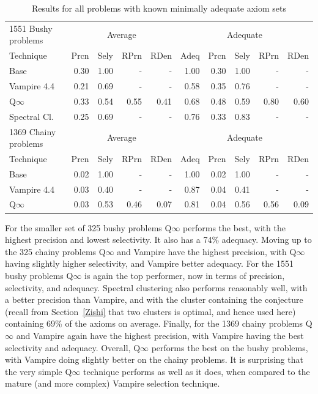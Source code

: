 \documentclass[EPiC]{easychair}
\begin{document}
\begin{table}[hbt]
\begin{center}
\begin{tabular}{|l|rrrr|r|rrrr|}
\hline
1551 Bushy problems  & \multicolumn{4}{|c|}{Average} & \multicolumn{5}{|c|}{Adequate} \\
Technique       & Prcn & Sely & RPrn & RDen & Adeq & Prcn & Sely & RPrn & RDen \\
\hline
Base            & 0.30 & 1.00 &  -   &  -   & 1.00 & 0.30 & 1.00 &  -   &  -   \\
Vampire 4.4     & 0.21 & 0.69 &  -   &  -   & 0.58 & 0.35 & 0.76 &  -   &  -   \\
Q$\infty$       & 0.33 & 0.54 & 0.55 & 0.41 & 0.68 & 0.48 & 0.59 & 0.80 & 0.60 \\
Spectral Cl.    & 0.25 & 0.69 &  -   &  -   & 0.76 & 0.33 & 0.83 &  -   &  -   \\
\hline
\hline
1369 Chainy problems & \multicolumn{4}{|c|}{Average} & \multicolumn{5}{|c|}{Adequate} \\
Technique       & Prcn & Sely & RPrn & RDen & Adeq & Prcn & Sely & RPrn & RDen \\
\hline
Base            & 0.02 & 1.00 &  -   &  -   & 1.00 & 0.02 & 1.00 &  -   &  -   \\
Vampire 4.4     & 0.03 & 0.40 &  -   &  -   & 0.87 & 0.04 & 0.41 &  -   &  -   \\
Q$\infty$       & 0.03 & 0.53 & 0.46 & 0.07 & 0.81 & 0.04 & 0.56 & 0.56 & 0.09 \\
\hline
\end{tabular}
\caption{Results for all problems with known minimally adequate axiom sets}
\label{Results2078}
\end{center}
\end{table}

For the smaller set of 325 bushy problems Q$\infty$ performs the best, with
the highest precision and lowest selectivity.
It also has a 74\% adequacy.
Moving up to the 325 chainy problems Q$\infty$ and Vampire have the highest
precision, with Q$\infty$ having slightly higher selectivity, and Vampire
better adequacy.
For the 1551 bushy problems Q$\infty$ is again the top performer, now in
terms of precision, selectivity, and adequacy.
Spectral clustering also performs reasonably well, with a better precision
than Vampire, and with the cluster containing the conjecture (recall from 
Section~\ref{Zishi} that two clusters is optimal, and hence used here) 
containing 69\% of the axioms on average.
Finally, for the 1369 chainy problems Q$\infty$ and Vampire again have the 
highest precision, with Vampire having the best selectivity and adequacy.
Overall, Q$\infty$ performs the best on the bushy problems, with Vampire
doing slightly better on the chainy problems.
It is surprising that the very simple Q$\infty$ technique performs 
as well as it does, when compared to the mature (and more complex) Vampire 
selection technique.
\end{document}
